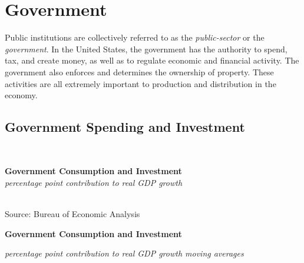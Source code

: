 \documentclass{report}
\makeatletter
\newcommand{\tbllink}[1]{\href{https://raw.githubusercontent.com/bdecon/US-chartbook/master/chartbook/data/#1}{\faTable}}
\newcommand*\short[1]{\expandafter\@gobbletwo\number\numexpr#1\relax}
\newcommand{\sbar}[4]{
		\addplot[ybar stacked, bar width=2.6pt, draw opacity=0, fill=#1] 
			table [x=#2, y=#3, col sep=comma]{#4};}
\newcommand{\dateaxisticks}{
		date coordinates in=x, axis line style={draw=none},
		xmax={2020-05-10},
		max space between ticks=40,	    
		xtick={{1990-01-01}, {1992-01-01}, {1994-01-01}, 
			{1996-01-01}, {1998-01-01}, {2000-01-01}, 
			{2002-01-01}, {2004-01-01}, {2006-01-01},
			{2008-01-01}, {2010-01-01}, {2012-01-01}, {2014-01-01},
		    {2016-01-01}, {2018-01-01}, {2020-01-01}},
		minor xtick={{1989-01-01}, {1991-01-01}, {1993-01-01},
			{1995-01-01}, {1997-01-01}, {1999-01-01}, 
			{2001-01-01}, {2003-01-01}, {2005-01-01}, {2007-01-01},
		    {2009-01-01}, {2011-01-01}, {2013-01-01}, {2015-01-01},
		    {2017-01-01}, {2019-01-01}},
		enlarge y limits={0.06}, enlarge x limits={0.01},
		}
\newcommand{\bbar}[2]{extra #1 ticks = {{#2}}, extra #1 tick labels = ,
		extra #1 tick style = {grid=major, grid style={thick, black!25}},}
\newcommand{\rbars}{
		\fill[color=black!10] (axis cs:{1990-07-01},\pgfkeysvalueof{/pgfplots/ymin}) rectangle 
			(axis cs:{1991-03-01}, \pgfkeysvalueof{/pgfplots/ymax});
		\fill[color=black!10] (axis cs:{2007-12-01},\pgfkeysvalueof{/pgfplots/ymin}) rectangle 
			(axis cs:{2009-07-01}, \pgfkeysvalueof{/pgfplots/ymax});
		\fill[color=black!10] (axis cs:{2001-03-01},\pgfkeysvalueof{/pgfplots/ymin}) rectangle 
			(axis cs:{2001-11-01}, \pgfkeysvalueof{/pgfplots/ymax});}
\makeatother
\begin{document}
{{{{{{\begin{minipage}{0.76\textwidth}
\end{minipage}

\newpage


\begin{minipage}{0.76\textwidth}
\section*{\color{darkgray}\LARGE Government}
\label{sec:gov}
\normalsize

\small Public institutions are collectively referred to as the \textit{public-sector} or the \textit{government}. In the United States, the government has the authority to spend, tax, and create money, as well as to regulate economic and financial activity. The government also enforces and determines the ownership of property. These activities are all extremely important to production and distribution in the economy.


\subsection*{\color{black!70} \seriffont Government Spending and Investment}
\small   \\
\vspace{2mm}

\noindent \normalsize \textbf{Government Consumption and Investment}\\
\footnotesize{\textit{percentage point contribution to real GDP growth}}\\
\noindent \hspace*{-2mm} \\
\footnotesize{Source: Bureau of Economic Analysis} \hfill \tbllink{gov.csv}

\end{minipage}
\vspace{6mm}

\noindent \normalsize \textbf{Government Consumption and Investment}\\
\footnotesize{\textit{percentage point contribution to real GDP growth \hspace{41mm} moving averages}\\ \vspace{4mm}
\noindent {} \setlength{\tabcolsep}{3.1pt} \color{black!90}
		{\renewcommand{\arraystretch}{1.55}
		 \begin{tabular}{p{42mm} R{6.7mm} R{6.7mm} R{6.7mm} R{6.7mm} R{6.7mm} 
		   R{7.8mm} R{6.7mm} R{6.7mm} }
			 \hline
		\end{tabular}
		}	\\
		
}}}}}}}
\end{document}
